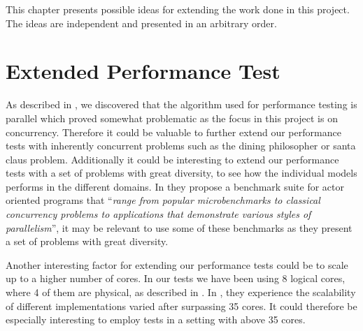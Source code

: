 \makeatletter {}\makeatother
{}
This chapter presents possible ideas for extending the work done in this project. The ideas are independent and presented in an arbitrary order.

\section{Extended Performance Test}
\label{sec:extended_performance_test}
As described in , we discovered that the algorithm used for performance testing is parallel which proved somewhat problematic as the focus in this project is on concurrency. Therefore it could be valuable to further extend our performance tests with inherently concurrent problems such as the dining philosopher or santa claus problem. Additionally it could be interesting to extend our performance tests with a set of problems with great diversity, to see how the individual models performs in the different domains. In \cite{imam2014savina} they propose a benchmark suite for actor oriented programs that ``\textit{range from popular microbenchmarks to classical concurrency problems to applications that demonstrate various styles of parallelism}'', it may be relevant to use some of these benchmarks as they present a set of problems with great diversity.

Another interesting factor for extending our performance tests could be to scale up to a higher number of cores. In our tests we have been using 8 logical cores, where 4 of them are physical, as described in . In \cite{harris2003language}, they experience the scalability of different implementations varied after surpassing 35 cores. It could therefore be especially interesting to employ tests in a setting with above 35 cores.



